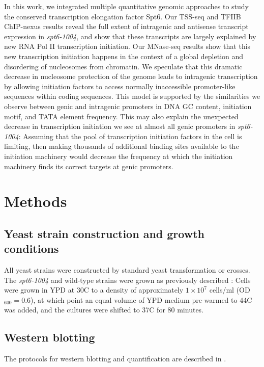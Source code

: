 In this work, we integrated multiple quantitative genomic approaches to study the conserved transcription elongation factor Spt6.
Our TSS-seq and TFIIB ChIP-nexus results reveal the full extent of intragenic and antisense transcript expression in \textit{spt6-1004}, and show that these transcripts are largely explained by new RNA Pol II transcription initiation.
Our MNase-seq results show that this new transcription initiation happens in the context of a global depletion and disordering of nucleosomes from chromatin.
We speculate that this dramatic decrease in nucleosome protection of the genome leads to intragenic transcription by allowing initiation factors to access normally inaccessible promoter-like sequences within coding sequences.
This model is supported by the similarities we observe between genic and intragenic promoters in DNA GC content, initiation motif, and TATA element frequency.
This may also explain the unexpected decrease in transcription initiation we see at almost all genic promoters in \textit{spt6-1004}: Assuming that the pool of transcription initiation factors in the cell is limiting, then making thousands of additional binding sites available to the initiation machinery would decrease the frequency at which the initiation machinery finds its correct targets at genic promoters.

\clearpage
\section{Methods}

\subsection{Yeast strain construction and growth conditions}

All yeast strains were constructed by standard yeast transformation or crosses.
The \textit{spt6-1004} and wild-type strains were grown as previously described \citep{cheung2008}: Cells were grown in YPD at 30\textdegree C to a density of approximately $1 \times 10^7$ cells/ml (OD$_{600} = 0.6$), at which point an equal volume of YPD medium pre-warmed to 44\textdegree C was added, and the cultures were shifted to 37\textdegree C for 80 minutes.

\subsection{Western blotting}

The protocols for western blotting and quantification are described in \citet{doris2018}.

